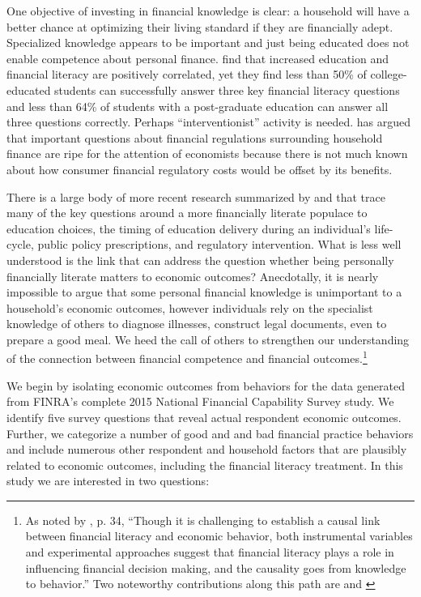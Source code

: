 \documentclass[12pt]{article}
\theoremstyle{plain}
\begin{document}
One objective of investing in financial knowledge is clear:  a household will have a better chance at optimizing their living standard if they are financially adept.  Specialized knowledge appears to be important and just being educated does not enable competence about personal finance.  \cite{mitchell2015financial} find that increased education and financial literacy are positively correlated, yet they find less than 50\% of college-educated students can successfully answer three key financial literacy questions and less than 64\% of students with a post-graduate education can answer all three questions correctly.  Perhaps ``interventionist'' activity is needed.  \cite{elylecture} has argued that important questions about financial regulations surrounding household finance are ripe for the attention of economists because there is not much known about how consumer financial regulatory costs would be offset by its benefits.

There is a large body of more recent research summarized by \cite{hastings2013financial} and \cite{lusardi2014economic} that trace many of the key questions around a more financially literate populace to education choices, the timing of education delivery during an individual’s life-cycle, public policy prescriptions, and regulatory intervention.  What is less well understood is the link that can address the question whether being personally financially literate matters to economic outcomes? Anecdotally, it is nearly impossible to argue that some personal financial knowledge is unimportant to a household's economic outcomes, however individuals rely on the specialist knowledge of others to diagnose illnesses, construct legal documents, even to prepare a good meal.  We heed the call of others to strengthen our understanding of the connection between financial competence and financial outcomes.\footnote{As noted by \cite{lusardi2014economic}, p. 34, ``Though it is challenging to establish a causal link between financial literacy and economic behavior, both instrumental variables and experimental approaches suggest that financial literacy plays a role in influencing financial decision making, and the causality goes from knowledge to behavior.''  
Two noteworthy contributions along this path are \cite{calvet2007down} and \cite{agarwal2009age}} 

We begin by isolating economic outcomes from behaviors for the data generated from FINRA's complete 2015 National Financial Capability Survey study.  We identify five survey questions that reveal actual respondent economic outcomes.  Further, we categorize a number of good and and bad financial practice behaviors and include numerous other respondent and household factors that are plausibly related to economic outcomes, including the financial literacy treatment.   In this study we are interested in two questions:  
\end{document}
